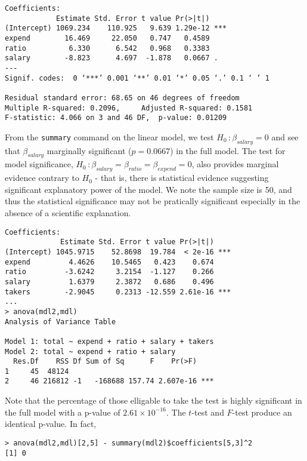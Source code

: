 \documentclass{homework}
\begin{document}
\begin{minipage}{.6\textwidth}
{\small \begin{verbatim}
Coefficients:
            Estimate Std. Error t value Pr(>|t|)    
(Intercept) 1069.234    110.925   9.639 1.29e-12 ***
expend        16.469     22.050   0.747   0.4589    
ratio          6.330      6.542   0.968   0.3383    
salary        -8.823      4.697  -1.878   0.0667 .  
---
Signif. codes:  0 ‘***’ 0.001 ‘**’ 0.01 ‘*’ 0.05 ‘.’ 0.1 ‘ ’ 1 

Residual standard error: 68.65 on 46 degrees of freedom
Multiple R-squared: 0.2096,     Adjusted R-squared: 0.1581 
F-statistic: 4.066 on 3 and 46 DF,  p-value: 0.01209 
\end{verbatim}}
\end{minipage}
\begin{minipage}{.4\textwidth}
From the \texttt{summary} command on the linear model, we test $H_0\,:\beta_{salary} = 0$ and see that $\beta_{salary}$ marginally significant ($p = 0.0667$) in the full model. The test for model significance, $H_0\,:\beta_{salary} = \beta_{ratio} = \beta_{expend} = 0$, also provides marginal evidence contrary to $H_0$ - that is, there is statistical evidence suggesting significant explanatory power of the model. We note the sample size is 50, and thus the statistical significance may not be pratically significant especially in the absence of a scientific explanation. 
\end{minipage}


\begin{minipage}{.6\textwidth}
{\small \begin{verbatim}
Coefficients:
             Estimate Std. Error t value Pr(>|t|)    
(Intercept) 1045.9715    52.8698  19.784  < 2e-16 ***
expend         4.4626    10.5465   0.423    0.674    
ratio         -3.6242     3.2154  -1.127    0.266    
salary         1.6379     2.3872   0.686    0.496    
takers        -2.9045     0.2313 -12.559 2.61e-16 ***
...
> anova(mdl2,mdl) 
Analysis of Variance Table

Model 1: total ~ expend + ratio + salary + takers
Model 2: total ~ expend + ratio + salary
  Res.Df    RSS Df Sum of Sq      F    Pr(>F)    
1     45  48124                                  
2     46 216812 -1   -168688 157.74 2.607e-16 ***
\end{verbatim}}
\end{minipage}
\begin{minipage}{.4\textwidth}
Note that the percentage of those elligable to take the test is highly significant in the full model with a p-value of $2.61\times10^{-16}$. The $t$-test and $F$-test produce an identical p-value.  In fact,
{\footnotesize \begin{verbatim}
> anova(mdl2,mdl)[2,5] - summary(mdl2)$coefficients[5,3]^2 
[1] 0
\end{verbatim}
}

\end{minipage}
\end{document}
